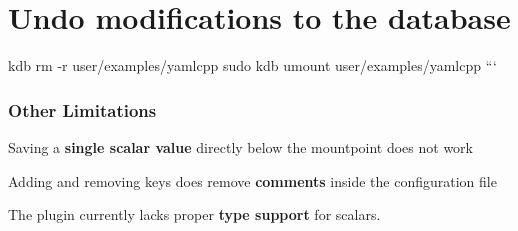 \section*{Undo modifications to the database}

kdb rm -\/r user/examples/yamlcpp sudo kdb umount user/examples/yamlcpp ```

\subsubsection*{Other Limitations}


\begin{DoxyItemize}
\item Saving a {\bfseries single scalar value} directly below the mountpoint does not work
\item Adding and removing keys does remove {\bfseries comments} inside the configuration file
\item The plugin currently lacks proper {\bfseries type support} for scalars. 
\end{DoxyItemize}